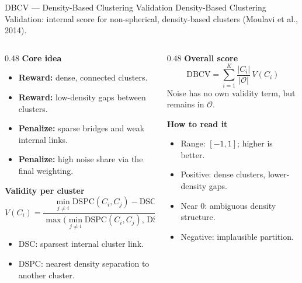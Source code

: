 \begin{frame}[noframenumbering]{DBCV — Density-Based Clustering Validation}
  \footnotesize
  Density-Based Clustering Validation: internal score for non-spherical,
  density-based clusters (Moulavi et al., 2014).
  \vspace{0.45em}

  \begin{columns}[T]
    \begin{column}{0.48\textwidth}
      \scriptsize
      \textbf{Core idea}
      \begin{itemize}\setlength\itemsep{0.25em}
        \item \textbf{Reward:} dense, connected clusters.
        \item \textbf{Reward:} low-density gaps between clusters.
        \item \textbf{Penalize:} sparse bridges and weak internal links.
        \item \textbf{Penalize:} high noise share via the final weighting.
      \end{itemize}
      \vspace{0.45em}
      \textbf{Validity per cluster}
      \[
        V(C_i)=
        \frac{\min_{j\neq i}\text{DSPC}(C_i,C_j)-\text{DSC}(C_i)}
             {\max\!\bigl(\min_{j\neq i}\text{DSPC}(C_i,C_j),\,
                          \text{DSC}(C_i)\bigr)}
      \]
      \vspace{-0.6em}
      \begin{itemize}\setlength\itemsep{0.15em}
        \item $\text{DSC}$: sparsest internal cluster link.
        \item $\text{DSPC}$: nearest density separation to another cluster.
      \end{itemize}
    \end{column}

    \begin{column}{0.48\textwidth}
      \scriptsize
      \textbf{Overall score}
      \[
        \text{DBCV} =
        \sum_{i=1}^{K} \frac{|C_i|}{|\mathcal{O}|}\, V(C_i)
      \]
      Noise has no own validity term, but remains in $\mathcal{O}$.
      \vspace{0.45em}
      
      \textbf{How to read it}
      \begin{itemize}\setlength\itemsep{0.15em}
        \item Range: $[-1,1]$; higher is better.
        \item Positive: dense clusters, lower-density gaps.
        \item Near $0$: ambiguous density structure.
        \item Negative: implausible partition.
      \end{itemize}
    \end{column}
  \end{columns}
\end{frame}
